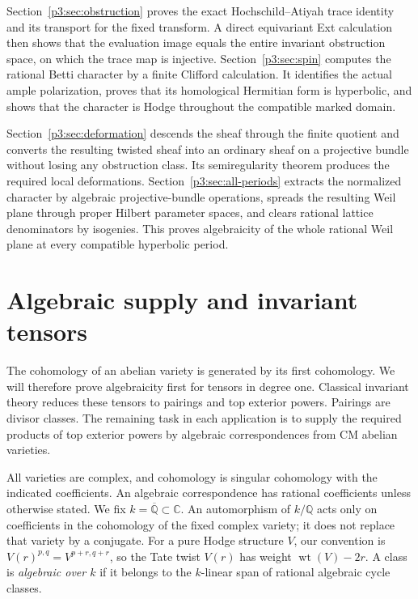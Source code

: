 \documentclass[11pt]{article}
\newcommand{\Q}{\mathbb Q}
\newcommand{\C}{\mathbb C}
\newcommand{\Qbar}{\overline{\mathbb Q}}
\numberwithin{equation}{section}
\begin{document}
Section~\ref{p3:sec:obstruction} proves the exact Hochschild--Atiyah trace
identity and its transport for the fixed transform. A direct equivariant
Ext calculation then shows that the evaluation image equals the entire
invariant obstruction space, on which the trace map is injective.
Section~\ref{p3:sec:spin} computes the rational Betti character by a finite
Clifford calculation. It identifies the actual ample polarization, proves
that its homological Hermitian form is hyperbolic, and shows that the
character is Hodge throughout the compatible marked domain.

Section~\ref{p3:sec:deformation} descends the sheaf through the finite
quotient and converts the resulting twisted sheaf into an ordinary sheaf
on a projective bundle without losing any obstruction class. Its
semiregularity theorem produces the required local deformations.
Section~\ref{p3:sec:all-periods} extracts the normalized character by
algebraic projective-bundle operations, spreads the resulting Weil plane through
proper Hilbert parameter spaces, and clears rational lattice denominators
by isogenies. This proves algebraicity of the whole rational Weil plane at
every compatible hyperbolic period.

\section{Algebraic supply and invariant tensors}
\label{p3:sec:tensors}

The cohomology of an abelian variety is generated by its first
cohomology.  We will therefore prove algebraicity first for tensors in
degree one.  Classical invariant theory reduces these tensors to
pairings and top exterior powers.  Pairings are divisor classes.  The
remaining task in each application is to supply the required products
of top exterior powers by algebraic correspondences from CM abelian
varieties.

All varieties are complex, and cohomology is singular cohomology with
the indicated coefficients.  An algebraic correspondence has rational
coefficients unless otherwise stated.  We fix
$k=\Qbar\subset\C$.  An automorphism of $k/\Q$ acts only on
coefficients in the cohomology of the fixed complex variety; it does
not replace that variety by a conjugate.  For a pure Hodge structure
$V$, our convention is
$V(r)^{p,q}=V^{p+r,q+r}$, so the Tate twist $V(r)$ has weight
$\operatorname{wt}(V)-2r$.
A class is \emph{algebraic over $k$} if it belongs to the
$k$-linear span of rational algebraic cycle classes.
\end{document}
